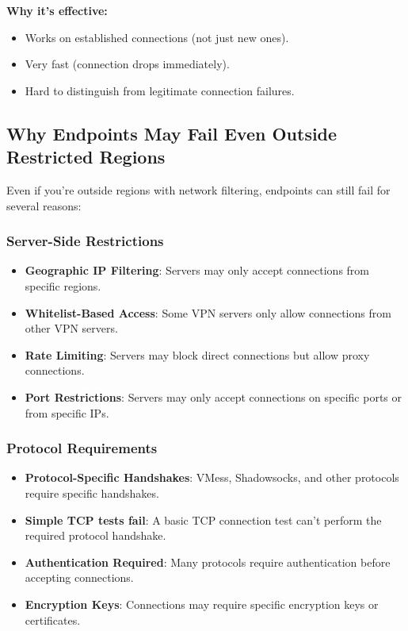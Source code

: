 \textbf{Why it's effective:}
\begin{itemize}
    \item Works on established connections (not just new ones).
    \item Very fast (connection drops immediately).
    \item Hard to distinguish from legitimate connection failures.
\end{itemize}

\subsection{Why Endpoints May Fail Even Outside Restricted Regions}

Even if you're outside regions with network filtering, endpoints can still fail for several reasons:

\subsubsection{Server-Side Restrictions}

\begin{itemize}
    \item \textbf{Geographic IP Filtering}: Servers may only accept connections from specific regions.
    \item \textbf{Whitelist-Based Access}: Some VPN servers only allow connections from other VPN servers.
    \item \textbf{Rate Limiting}: Servers may block direct connections but allow proxy connections.
    \item \textbf{Port Restrictions}: Servers may only accept connections on specific ports or from specific IPs.
\end{itemize}

\subsubsection{Protocol Requirements}

\begin{itemize}
    \item \textbf{Protocol-Specific Handshakes}: VMess, Shadowsocks, and other protocols require specific handshakes.
    \item \textbf{Simple TCP tests fail}: A basic TCP connection test can't perform the required protocol handshake.
    \item \textbf{Authentication Required}: Many protocols require authentication before accepting connections.
    \item \textbf{Encryption Keys}: Connections may require specific encryption keys or certificates.
\end{itemize}

